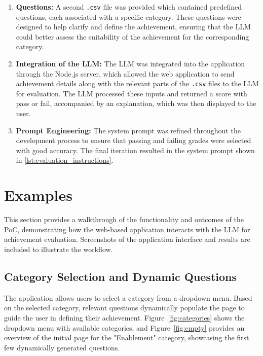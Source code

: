\begin{enumerate}
    \item \textbf{Questions:} A second \texttt{.csv} file was provided which contained predefined questions, each associated with a specific category. 
    These questions were designed to help clarify and define the achievement, ensuring that the \ac{LLM} could better assess the suitability of the achievement for the corresponding category.
    
    \item \textbf{Integration of the \ac{LLM}:} The \ac{LLM} was integrated into the application through the Node.js server, 
    which allowed the web application to send achievement details along with the relevant parts of the \texttt{.csv} files to the \ac{LLM} for evaluation. 
    The \ac{LLM} processed these inputs and returned a score with pass or fail, accompanied by an explanation, which was then displayed to the user.

    \item \textbf{Prompt Engineering:} The system prompt was refined throughout the development process to ensure that passing and failing grades were selected with good accuracy. 
    The final iteration resulted in the system prompt shown in \ref{lst:evaluation_instructions}.
\end{enumerate}

\section{Examples}
\label{examples}

This section provides a walkthrough of the functionality and outcomes of the \ac{PoC}, demonstrating how the web-based application interacts with the \ac{LLM} for achievement evaluation. 
Screenshots of the application interface and results are included to illustrate the workflow.

\subsection{Category Selection and Dynamic Questions}
The application allows users to select a category from a dropdown menu. Based on the selected category, relevant questions dynamically populate the page to guide the user in defining their achievement. 
Figure~\ref{fig:categories} shows the dropdown menu with available categories, and Figure~\ref{fig:empty} provides an overview of the initial page for the "Enablement" category, 
showcasing the first few dynamically generated questions.

